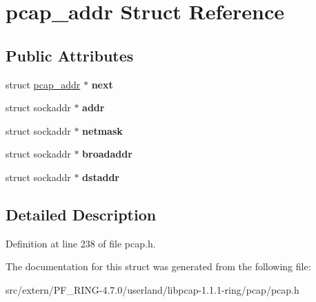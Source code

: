 \hypertarget{structpcap__addr}{
\section{pcap\_\-addr Struct Reference}
\label{structpcap__addr}
}
\subsection*{Public Attributes}
\begin{DoxyCompactItemize}
\item 
\hypertarget{structpcap__addr_a0e06e2971b2a440077fc4a5f2e15ec02}{
struct \hyperlink{structpcap__addr}{pcap\_\-addr} $\ast$ {\bfseries next}}
\label{structpcap__addr_a0e06e2971b2a440077fc4a5f2e15ec02}

\item 
\hypertarget{structpcap__addr_a160ec513636449a3f6ced1abb4beb24b}{
struct sockaddr $\ast$ {\bfseries addr}}
\label{structpcap__addr_a160ec513636449a3f6ced1abb4beb24b}

\item 
\hypertarget{structpcap__addr_a5058b6abfcf692abab3340a30763ea50}{
struct sockaddr $\ast$ {\bfseries netmask}}
\label{structpcap__addr_a5058b6abfcf692abab3340a30763ea50}

\item 
\hypertarget{structpcap__addr_af200a2599cff126ba3d5cd00b3e35956}{
struct sockaddr $\ast$ {\bfseries broadaddr}}
\label{structpcap__addr_af200a2599cff126ba3d5cd00b3e35956}

\item 
\hypertarget{structpcap__addr_aa2d68233ad041af0cdf7dac1edbf508a}{
struct sockaddr $\ast$ {\bfseries dstaddr}}
\label{structpcap__addr_aa2d68233ad041af0cdf7dac1edbf508a}

\end{DoxyCompactItemize}


\subsection{Detailed Description}


Definition at line 238 of file pcap.h.



The documentation for this struct was generated from the following file:\begin{DoxyCompactItemize}
\item 
src/extern/PF\_\-RING-\/4.7.0/userland/libpcap-\/1.1.1-\/ring/pcap/pcap.h\end{DoxyCompactItemize}
